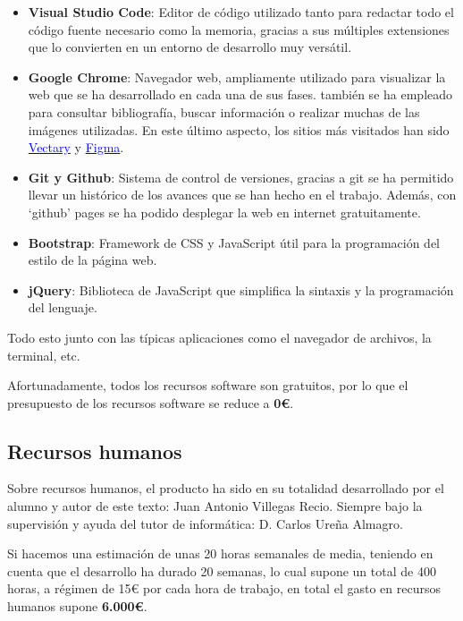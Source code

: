 \begin{itemize}
    \item \textbf{Visual Studio Code}: Editor de código utilizado tanto para redactar todo el código fuente necesario como la memoria, gracias a sus múltiples extensiones que lo convierten en un entorno de desarrollo muy versátil.
    \item \textbf{Google Chrome}: Navegador web, ampliamente utilizado para visualizar la web que se ha desarrollado en cada una de sus fases. también se ha empleado para consultar bibliografía, buscar información o realizar muchas de las imágenes utilizadas. En este último aspecto, los sitios más visitados han sido \href{https://www.vectary.com/}{\textcolor{blue}{Vectary}} y  \href{https://www.figma.com/}{\textcolor{blue}{Figma}}.
    \item \textbf{Git y Github}: Sistema de control de versiones, gracias a git se ha permitido llevar un histórico de los avances que se han hecho en el trabajo. Además, con `github' pages se ha podido desplegar la web en internet gratuitamente.
    \item \textbf{Bootstrap}: Framework de CSS y JavaScript útil para la programación del estilo de la página web.
    \item \textbf{jQuery}: Biblioteca de JavaScript que simplifica la sintaxis y la programación del lenguaje.
\end{itemize}

Todo esto junto con las típicas aplicaciones como el navegador de archivos, la terminal, etc.

Afortunadamente, todos los recursos software son gratuitos, por lo que el presupuesto de los recursos software se reduce a \textbf{0€}.

\subsection*{Recursos humanos}

Sobre recursos humanos, el producto ha sido en su totalidad desarrollado por el alumno y autor de este texto: Juan Antonio Villegas Recio. Siempre bajo la supervisión y ayuda del tutor de informática: D. Carlos Ureña Almagro.

Si hacemos una estimación de unas 20 horas semanales de media, teniendo en cuenta que el desarrollo ha durado 20 semanas, lo cual supone un total de 400 horas, a régimen de 15€ por cada hora de trabajo, en total el gasto en recursos humanos supone \textbf{6.000€}.


